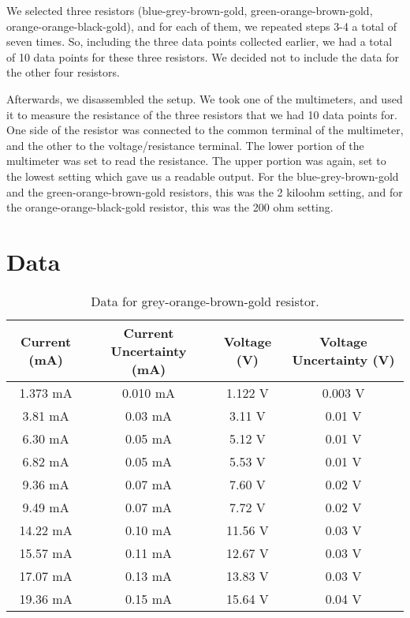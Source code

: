 \documentclass[11pt]{article}
\begin{document}
We selected three resistors (blue-grey-brown-gold, green-orange-brown-gold, orange-orange-black-gold), and for each of them, we repeated steps 3-4 a total of seven times. So, including the three data points collected earlier, we had a total of 10 data points for these three resistors. We decided not to include the data for the other four resistors. 

Afterwards, we disassembled the setup. We took one of the multimeters, and used it to measure the resistance of the three resistors that we had 10 data points for. One side of the resistor was connected to the common terminal of the multimeter, and the other to the voltage/resistance terminal. The lower portion of the multimeter was set to read the resistance. The upper portion was again, set to the lowest setting which gave us a readable output. For the blue-grey-brown-gold and the green-orange-brown-gold resistors, this was the 2 kiloohm setting, and for the orange-orange-black-gold resistor, this was the 200 ohm setting. 

\section{Data}


\begin{table}[htb]
    \caption{\label{tab:tab1}Data for grey-orange-brown-gold resistor.}
    \vspace{1em}\hline\hline\vspace{0.3em}\centering
    \begin{tabular}{cccc}
        Current (mA)&Current Uncertainty (mA)&Voltage (V)&Voltage Uncertainty (V)\\
        \hline
1.373 mA&0.010 mA&1.122 V&0.003 V\\
3.81 mA&0.03 mA&3.11 V&0.01 V\\
6.30 mA&0.05 mA&5.12 V&0.01 V\\
6.82 mA&0.05 mA&5.53 V&0.01 V\\
9.36 mA&0.07 mA&7.60 V&0.02 V\\
9.49 mA&0.07 mA&7.72 V&0.02 V\\
14.22 mA&0.10 mA&11.56 V&0.03 V\\
15.57 mA&0.11 mA&12.67 V&0.03 V\\
17.07 mA&0.13 mA&13.83 V&0.03 V\\
19.36 mA&0.15 mA&15.64 V&0.04 V\\

    \end{tabular}
    \hline\hline
\end{table}
\end{document}
